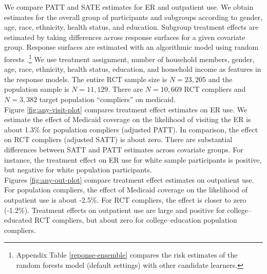 \documentclass[12pt]{article}
\begin{document}
We compare PATT and SATE estimates for ER and outpatient use. We obtain estimates for the overall group of participants and subgroups according to gender, age, race, ethnicity, health status, and education. Subgroup treatment effects are estimated by taking differences across response surfaces for a given covariate group. Response surfaces are estimated with an algorithmic model using random forests \citep{breiman2001}.\footnote{Appendix Table \ref{reponse-ensemble} compares the risk estimates of the random forests model (default settings) with other candidate learners.} We use treatment assignment, number of household members, gender, age, race, ethnicity, health status, education, and household income as features in the response models. The entire RCT sample size is $N=23,205$ and the population sample is $N=11,129$. There are $N=10,669$ RCT compliers and $N=3,382$ target population ``compliers'' on medicaid. \\

Figure \ref{fig:any-visit-plot} compares treatment effect estimates on ER use. We estimate the effect of Medicaid coverage on the likelihood of visiting the ER is about 1.3\% for population compliers (adjusted PATT). In comparison, the effect on RCT compliers (adjusted SATT) is about zero. There are substantial differences between SATT and PATT estimates across covariate groups. For instance, the treatment effect on ER use for white sample participants is positive, but negative for white population participants. \\

Figures \ref{fig:any-out-plot} compare treatment effect estimates on outpatient use. For population compliers, the effect of Medicaid coverage on the likelihood of outpatient use is about -2.5\%. For RCT compliers, the effect is closer to zero (-1.2\%). Treatment effects on outpatient use are large and positive for college--educated RCT compliers, but about zero for college--education population compliers. 
\end{document}
